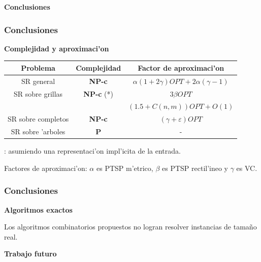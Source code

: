 \documentclass{beamer}
\newcommand{\class}[1]{\textnormal{\textbf{#1}}}
\newcommand{\probl}[1]{\textnormal{\textsf{#1}}}
\begin{document}
\begin{frame}
\begin{center}
\begin{Large}
\textbf{Conclusiones}
\end{Large}
\end{center}
\end{frame}

\begin{frame}
\frametitle{Conclusiones}

\textbf{Complejidad y aproximaci'on}

\begin{center}
\begin{tabular}{|c|c|c|}
\hline
\textbf{Problema} & \textbf{Complejidad} & \textbf{Factor de aproximaci'on}\\
\hline
\hline
\probl{SR} general & \class{NP-c} & $\alpha(1 + 2\gamma)OPT + 2\alpha(\gamma - 1)$\\
\hline
\probl{SR} sobre grillas & \class{NP-c} (*) & $3 \beta OPT$\\
& & $(1.5 + C(n, m)) OPT + O(1)$\\
\hline
\probl{SR} sobre completos & \class{NP-c} & $(\gamma + \varepsilon)OPT$\\
\hline
\probl{SR} sobre 'arboles & \class{P} & -\\
\hline
\end{tabular}
\begin{flushleft}
{\small *: asumiendo una representaci'on impl'icita de la entrada.}
\end{flushleft}
\end{center}

Factores de aproximaci'on: $\alpha$ es \probl{PTSP} m'etrico, $\beta$ es \probl{PTSP} rectil'ineo y $\gamma$ es \probl{VC}.

\end{frame}

\begin{frame}
\frametitle{Conclusiones}

\textbf{Algoritmos exactos}

\vspace{2mm}

Los algoritmos combinatorios propuestos no logran resolver instancias de tama\~no real.

\end{frame}

\begin{frame}
\begin{center}
\begin{Large}
\textbf{Trabajo futuro}
\end{Large}
\end{center}
\end{frame}
\end{document}
